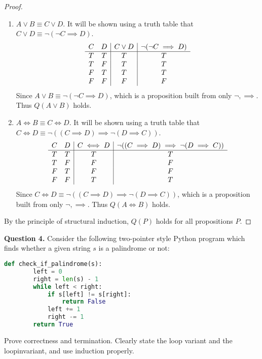 \documentclass[11pt]{article}
\begin{document}
\begin{proof}
\begin{enumerate}
            \item \(A \lor B \equiv C \lor D\). It will be shown using a truth table that \(C \lor D \equiv \neg(\neg C\implies D)\).
            \begin{displaymath}
                \begin{array}{c c | c | c}
                    C & D & C \lor D & \neg(\neg C\implies D)\\
                    \hline
                    T & T & T & T\\
                    T & F & T & T\\
                    F & T & T & T\\
                    F & F & F & F\\
                \end{array}
            \end{displaymath}
            Since \(A \lor B \equiv \neg(\neg C\implies D)\), which is a proposition built from only \(\neg, \implies\). Thus \(Q(A \lor B)\) holds.

            \item \(A \iff B \equiv C \iff D\). It will be shown using a truth table that \(C \iff D \equiv \neg((C \implies D) \implies \neg(D \implies C))\).
            \begin{displaymath}
                \begin{array}{c c | c | c}
                    C & D & C \iff D & \neg((C \implies D) \implies \neg(D \implies C))\\
                    \hline
                    T & T & T & T\\
                    T & F & F & F\\
                    F & T & F & F\\
                    F & F & T & T\\
                \end{array}
            \end{displaymath}
            Since \(C \iff D \equiv \neg((C \implies D) \implies \neg(D \implies C))\), which is a proposition built from only \(\neg, \implies\). Thus \(Q(A \iff B)\) holds.
        \end{enumerate}
        By the principle of structural induction, \(Q(P)\) holds for all propositions \(P\).
        
    \end{proof}
    \pagebreak
    \noindent\textbf{Question 4.} Consider the following two-pointer style Python program which finds whether a given string $s$ is a palindrome or not:
    \begin{lstlisting}[language=Python]
    def check_if_palindrome(s):
        left = 0
        right = len(s) - 1
        while left < right:
            if s[left] != s[right]:
                return False
            left += 1
            right -= 1
        return True
    \end{lstlisting}
    Prove correctness and termination. Clearly state the loop variant and the loopinvariant, and use induction properly.
\end{document}

